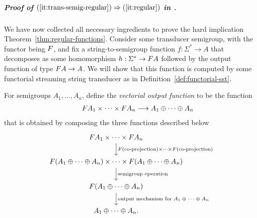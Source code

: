 

 




\subparagraph*{Proof of $(\ref{it:trans-semig-regular}) \Rightarrow (\ref{it:regular})$ in .}
We have now collected all necessary ingredients to prove the hard implication  Theorem~\ref{thm:regular-functions}. Consider some transducer semigroup, with the functor being $\functor$, and fix a string-to-semigroup function $f : \Sigma^* \to A$ that decomposes as some homomorphism $h : \Sigma^* \to \functor A$ followed by the output function of type $\functor A \to A$. 
We will show that this function  is computed by some functorial streaming string transducer as in Definition~\ref{def:functorial-sst}.

For semigroups $A_1,\ldots,A_n$, define the \emph{vectorial output function} to be the 
function%
\begin{align*}
\qquad\functor A_1 \times \cdots \times \functor A_n \longrightarrow A_1 \oplus \cdots \oplus A_n
\end{align*}
that is obtained by composing the three functions described below
\[
\begin{tikzcd}
\functor A_1 \times \cdots \times \functor A_n
\ar[d,"\functor(\text{co-projection}) \times \cdots \times \functor(\text{co-projection})"]
\\
\functor(A_1 \oplus \cdots \oplus A_n)
\times
\cdots
\times 
\functor(A_1 \oplus \cdots \oplus A_n)
\ar[d,"\text{semigroup operation}"]
\\
\functor(A_1 \oplus \cdots \oplus A_n)
\ar[d, "\text{output mechanism for $A_1 \oplus \cdots \oplus A_n$}"]\\ 
A_1 \oplus \cdots \oplus A_n.
\end{tikzcd}
\]

